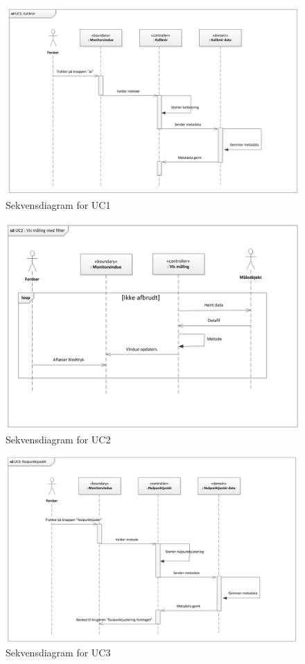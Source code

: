 \begin{figure}[H]
	\centering
	\includegraphics[width=1\textwidth]{Figurer/Snip20151102_9}
	\caption{Sekvensdiagram for UC1}
\end{figure}

\begin{figure}[H]
	\centering
	\includegraphics[width=1\textwidth]{Figurer/Snip20151102_10}
	\caption{Sekvensdiagram for UC2}
\end{figure}

\begin{figure}[H]
	\centering
	\includegraphics[width=1\textwidth]{Figurer/Snip20151102_11}
	\caption{Sekvensdiagram for UC3}
\end{figure}

